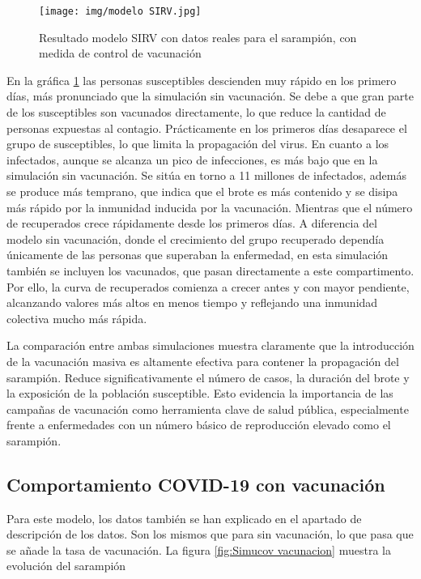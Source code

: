 \begin{figure}[H]
    \centering
    \texttt{[image: img/modelo SIRV.jpg]}
    \caption{Resultado modelo SIRV con datos reales para el sarampión, con medida de control de vacunación}
    \label{fig:simu saramp vacuna}
    \vspace{0.5cm} %
\end{figure}

En la gráfica \ref{fig:simu saramp vacuna} las personas susceptibles descienden muy rápido en los primero días, más pronunciado que la simulación sin vacunación. Se debe a que gran parte de los susceptibles son vacunados directamente, lo que reduce la cantidad de personas expuestas al contagio. Prácticamente en los primeros días desaparece el grupo de susceptibles, lo que limita la propagación del virus.
En cuanto a los infectados, aunque se alcanza un pico de infecciones, es más bajo que en la simulación sin vacunación. Se sitúa en torno a 11 millones de infectados, además se produce más temprano, que indica que el brote es más contenido y se disipa más rápido por la inmunidad inducida por la vacunación.
Mientras que el número de recuperados crece rápidamente desde los primeros días. A diferencia del modelo sin vacunación, donde el crecimiento del grupo recuperado dependía únicamente de las personas que superaban la enfermedad, en esta simulación también se incluyen los vacunados, que pasan directamente a este compartimento. Por ello, la curva de recuperados comienza a crecer antes y con mayor pendiente, alcanzando valores más altos en menos tiempo y reflejando una inmunidad colectiva mucho más rápida.

La comparación entre ambas simulaciones muestra claramente que la introducción de la vacunación masiva es altamente efectiva para contener la propagación del sarampión. Reduce significativamente el número de casos, la duración del brote y la exposición de la población susceptible. Esto evidencia la importancia de las campañas de vacunación como herramienta clave de salud pública, especialmente frente a enfermedades con un número básico de reproducción elevado como el sarampión.

\subsection{Comportamiento COVID-19 con vacunación}
Para este modelo, los datos también se han explicado en el apartado de descripción de los datos. Son los mismos que para sin vacunación, lo que pasa que se añade la tasa de vacunación. La figura \ref{fig:Simucov vacunacion} muestra la evolución del sarampión

